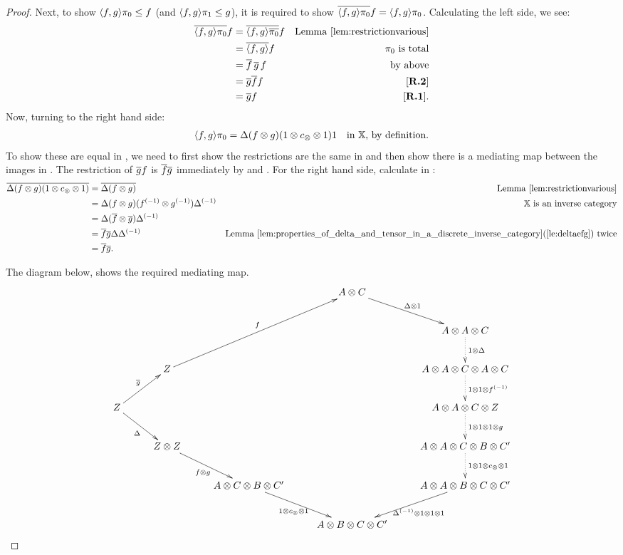 \begin{proof}
  Next, to show $\langle f,g\rangle \pi_0 \le f$ (and $\langle f,g\rangle \pi_1 \le g$), it is required to show
  $\overline{\langle f,g\rangle\pi_{0}} f = \langle f,g\rangle \pi_{0}$. Calculating the left side, we see:
  \begin{align*}
    \overline{\langle f,g\rangle\pi_{0}} f &=\overline{\langle f,g\rangle\overline{\pi_{0}}} f &\text{Lemma \ref{lem:restrictionvarious}}\\
    &=\overline{\langle f,g\rangle} f &\pi_{0}\text{ is total}\\
    &=\overline{f}\,\overline{g}\, f&\text{ by above}\\
    &=\overline{g} \overline{f} f & [\text{\bfseries {R}.{2}}]\\
    &=\overline{g} f& [\text{\bfseries {R}.{1}}].
  \end{align*}
  Now, turning to the right hand side:
  \begin{align*}
    \langle f,g\rangle\pi_{0} &= \Delta(f\otimes g)(1\otimes c_{\otimes}\otimes1) 1 &\text{in \ensuremath{\mathbb{X}}, by definition.}
  \end{align*}
  To show these are equal in \Xt, we need to first show the restrictions are the same in \X and
  then show there is a mediating map between the images in \X. The restriction of $\overline{g} f$ is
  $\overline{f} \overline{g}$ immediately by \rthree and \rtwo. For the right hand side, calculate in \X:
  \begin{align*}
    \overline{\Delta(f\otimes g)(1\otimes c_{\otimes}\otimes1)}
      & = \overline{\Delta(f\otimes g)} & \text{Lemma  \ref{lem:restrictionvarious}}\\
    & = \Delta(f\otimes g)({f}^{(-1)} \otimes {g}^{(-1)}){\Delta}^{(-1)} & \mathbb{X} \text{ is an inverse category}\\
    & = \Delta(\overline{f} \otimes \overline{g}){\Delta}^{(-1)} & \\
    & = \overline{f} \overline{g} \Delta{\Delta}^{(-1)} & \text{Lemma \ref{lem:properties_of_delta_and_tensor_in_a_discrete_inverse_category}(\ref{le:deltaefg}) twice}\\
    & = \overline{f} \overline{g}.
  \end{align*}

  The diagram below, shows the required mediating map.
  \[
    \xymatrix @C=27pt @R=25pt{
      & & & A \* C \ar[dr]^{\Delta\*1}\\
      & & & & A \* A \* C \ar@{.>}[d]^{1\*\Delta}\\
      &Z\ar[uurr]^{f}& & & A \* A\* C \* A \* C\ar@{.>}[d]^{1\*1\*\inv{f}}\\
      Z\ar[ur]^{\rst{g}}\ar[dr]_{\Delta}&& & &  A \* A \*C \* Z \ar@{.>}[d]^{1 \* 1 \* 1 \* g}\\
      &Z\*Z\ar[dr]_{f\* g}& & & A\*A\*C\*B\*C'\ar@{.>}[d]^{1\*1\*c_{\*}\*1}\\
      &&A\*C\*B\* C'\ar[dr]_{1\*c_{\*}\*1}&&A\*A\*B\*C\*C'\ar[dl]^{\inv{\Delta}\*1\*1\*1}\\
      & & & A\*B\*C\*C'
    }
  \]
\end{proof}

